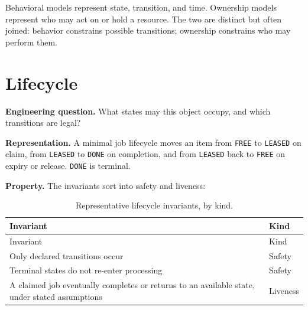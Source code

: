 
Behavioral models represent state, transition, and time. Ownership models represent who may act on or hold a resource. The two are distinct but often joined: behavior constrains possible transitions; ownership constrains who may perform them.

\section{Lifecycle}\label{heading:lifecycle}

\textbf{Engineering question.} What states may this object occupy, and which transitions are legal?

\textbf{Representation.} A minimal job lifecycle moves an item from \texttt{FREE} to \texttt{LEASED} on claim, from \texttt{LEASED} to \texttt{DONE} on completion, and from \texttt{LEASED} back to \texttt{FREE} on expiry or release. \texttt{DONE} is terminal.

\textbf{Property.} The invariants sort into safety and liveness:

{\footnotesize
\begin{longtable}[]{@{}
  >{\raggedright\arraybackslash}p{}
  >{\raggedright\arraybackslash}p{}@{}}
\caption[Lifecycle invariants]{Representative lifecycle invariants, by kind.}\tabularnewline
\toprule\noalign{}
\begin{minipage}[b]{\linewidth}\raggedright
Invariant
\end{minipage} & \begin{minipage}[b]{\linewidth}\raggedright
Kind
\end{minipage} \\
\midrule\noalign{}
\endfirsthead
\toprule\noalign{}
\begin{minipage}[b]{\linewidth}\raggedright
Invariant
\end{minipage} & \begin{minipage}[b]{\linewidth}\raggedright
Kind
\end{minipage} \\
\midrule\noalign{}
\endhead
\bottomrule\noalign{}
\endlastfoot
Only declared transitions occur & Safety \\
Terminal states do not re-enter processing & Safety \\
A claimed job eventually completes or returns to an available state, under stated assumptions & Liveness \\
\end{longtable}
}

